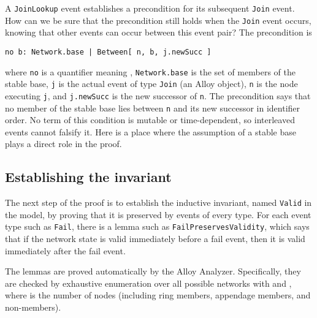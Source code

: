 \documentclass[conference]{IEEEtran}
\begin{document}
A 
\small
{\tt JoinLookup}
\normalsize
event establishes a precondition for its
subsequent
\small
{\tt Join}
\normalsize
event.
How can we be sure that the precondition still holds when the 
\small
{\tt Join}
\normalsize
event occurs, knowing that other events can occur
between this event pair?
The precondition is
\small
\begin{verbatim}
no b: Network.base | Between[ n, b, j.newSucc ]
\end{verbatim}
\normalsize
where
\small
{\tt no}
\normalsize
is a quantifier meaning ,
\small
{\tt Network.base}
\normalsize
is the set of members of the stable base,
\small
{\tt j}
\normalsize
is the actual event of type
\small
{\tt Join}
\normalsize
(an Alloy object),
\small
{\tt n}
\normalsize
is the node executing
\small
{\tt j},
\normalsize
and
\small
{\tt j.newSucc}
\normalsize
is the new successor of
\small
{\tt n}.
\normalsize
The precondition says that
no member of the stable base lies between
\small
{\tt n}
\normalsize
and its new successor in identifier order.
No term of this condition is mutable or time-dependent, so interleaved
events cannot falsify it.
Here is a place where the assumption of a stable base plays a direct
role in the proof.

\subsection{Establishing the invariant}

The next step of the proof is to establish the inductive invariant,
named 
\small
{\tt Valid}
\normalsize
in the model,
by proving that it is preserved by events of every type.
For each event type such as 
\small
{\tt Fail},
\normalsize
there is a lemma such as
\small
{\tt FailPreservesValidity},
\normalsize
which says that if the network state is valid immediately before a fail
event, then it is valid immediately after the fail event.

The lemmas are proved automatically by the Alloy Analyzer.
Specifically, they are checked by exhaustive enumeration over all
possible networks with
 and , where  is the number of nodes (including
ring members, appendage members, and non-members).
\end{document}

